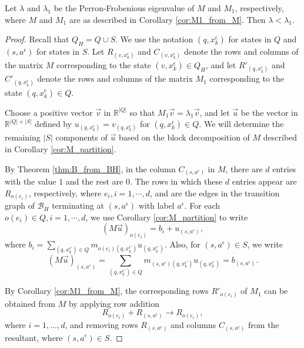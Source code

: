 \documentclass[10pt,a4paper]{amsart}
\newcommand{\B}{\mathcal{B}}
\newcommand{\e}{\epsilon}
\begin{document}
    \begin{mythm} \label{thm:main_lambda<lambda1}
        Let $\lambda$ and $\lambda_1$ be the Perron-Frobenious eigenvalue of $M$ and $M_1$, respectively, where $M$ and $M_1$ are as described in Corollary \ref{cor:M1_from_M}. 
        Then $ \lambda < \lambda_1.$
    \end{mythm}

    \begin{proof} 
    Recall that $Q_H = Q \cup S$. We use the notation $(q, x_k^{\e})$ for states in $Q$ and $(s, a^{\e})$ for states in $S$. Let $R_{(v, x_k^{\e})}$ and $C_{(v, x_k^{\e})}$ denote the rows and columns of the matrix $M$ corresponding to the state $(v, x_k^{\e}) \in Q_H$, and let $R'_{(q, x_k^{\e})}$ and $C'_{(q, x_k^{\e})}$ denote the rows and columns of the matrix $M_1$ corresponding to the state $(q, x_k^{\e}) \in Q$.

    Choose a positive vector $\overrightarrow{v}$ in $\mathbb{R}^{|Q|}$ so that $M_1\overrightarrow{v} = \lambda_1\overrightarrow{v}$, and let $\overrightarrow{u}$ be the vector in $\mathbb{R}^{|Q|+|S|}$ defined by $u_{(q,x_k^{\e})} = v_{(q,x_k^{\e})}$ for ${(q,x_k^{\e})} \in Q$. We will determine the remaining $|S|$ components of $\overrightarrow{u}$ based on the block decomposition of $M$ described in Corollary  \ref{cor:M_partition}.
    
    By Theorem \ref{thm:B_from_BH}, in the column $C_{(s,a^{\e})}$ in $M$, there are $d$ entries with the value $1$ and the rest are $0$. The rows in which these $d$ entries appear are $R_{o(e_i)}$, respectively, where $e_i, i = 1,\cdots,d$, and are the edges in the transition graph of $\B_H$ terminating at $(s,a^{\e})$ with label $a^{\e}.$ For each $o(e_i) \in Q, i = 1,\cdots,d$, we use Corollary \ref{cor:M_partition} to write 
     $$(M \overrightarrow{u})_{o(e_i)} = b_i + u_{(s,a^{\e})},$$  
     where $b_i = \displaystyle \sum_{(q,x_k^{\e'}) \in Q} m_{o(e_i)(q,x_k^{\e'})} u_{(q,x_k^{\e'})}.$ Also, for $(s,a^{\e}) \in S$, we write 
     $$(M \overrightarrow{u})_{(s,a^{\e})} = \sum_{(q,x_k^{\e'}) \in Q} m_{(s,a^{\e})(q,x_k^{\e'})} u_{(q,x_k^{\e'})} = b_{(s,a^{\e})}.$$
     
    By Corollary \ref{cor:M1_from_M}, the corresponding rows $R'_{o(e_i)}$ of $M_1$ can be obtained from $M$ by applying row addition 
    $$R_{o(e_i)} + R_{(s,a^{\e})} \rightarrow R_{o(e_i)},$$ 
    where $i = 1, \dots, d$, and removing rows $R_{(s,a^{\e})}$ and columns $C_{(s,a^{\e})}$ from the resultant, where $(s,a^{\e}) \in S$. 


\end{proof}
\end{document}
